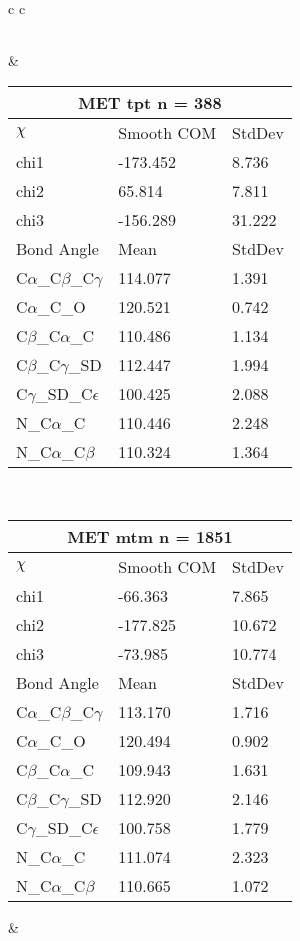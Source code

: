 \begin{longtable}{ c c }
\begin{tabular}{ l l l }
  \bottomrule
  \end{tabular}
  &
  \begin{tabular}{ l l l }
  \toprule
  \multicolumn{3}{c}{MET \textbf{tpt} n = 388} \\ \toprule
  $\chi$       & Smooth COM & StdDev \\ \midrule
  chi1 & -173.452 & 8.736 \\ 
  chi2 & 65.814 & 7.811 \\ 
  chi3 & -156.289 & 31.222 \\ \midrule
  Bond Angle   & Mean     & StdDev \\ \midrule
  C$\alpha$\_C$\beta$\_C$\gamma$ & 114.077 & 1.391\\
  C$\alpha$\_C\_O & 120.521 & 0.742\\
  C$\beta$\_C$\alpha$\_C & 110.486 & 1.134\\
  C$\beta$\_C$\gamma$\_SD & 112.447 & 1.994\\
  C$\gamma$\_SD\_C$\epsilon$ & 100.425 & 2.088\\
  N\_C$\alpha$\_C & 110.446 & 2.248\\
  N\_C$\alpha$\_C$\beta$ & 110.324 & 1.364\\
  \bottomrule
  \end{tabular}
  \\
  \begin{tabular}{ l l l }
  \toprule
  \multicolumn{3}{c}{MET \textbf{mtm} n = 1851} \\ \toprule
  $\chi$       & Smooth COM & StdDev \\ \midrule
  chi1 & -66.363 & 7.865 \\ 
  chi2 & -177.825 & 10.672 \\ 
  chi3 & -73.985 & 10.774 \\ \midrule
  Bond Angle   & Mean     & StdDev \\ \midrule
  C$\alpha$\_C$\beta$\_C$\gamma$ & 113.170 & 1.716\\
  C$\alpha$\_C\_O & 120.494 & 0.902\\
  C$\beta$\_C$\alpha$\_C & 109.943 & 1.631\\
  C$\beta$\_C$\gamma$\_SD & 112.920 & 2.146\\
  C$\gamma$\_SD\_C$\epsilon$ & 100.758 & 1.779\\
  N\_C$\alpha$\_C & 111.074 & 2.323\\
  N\_C$\alpha$\_C$\beta$ & 110.665 & 1.072\\
  \bottomrule
  \end{tabular}
  &
  \\
  
\end{longtable}    

